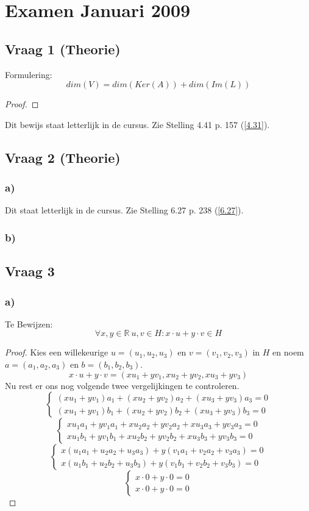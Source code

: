 \documentclass[lineaire_algebra_oplossingen.tex]{subfiles}
\begin{document}
\section{Examen Januari 2009}
\subsection{Vraag 1 (Theorie)}
Formulering:
\[
dim(V) = dim(Ker(A)) + dim(Im(L))
\]
\begin{proof}
\end{proof}
Dit bewijs staat letterlijk in de cursus. Zie Stelling 4.41 p. 157 (\ref{4.31}).

\subsection{Vraag 2 (Theorie)}
\subsubsection*{a)}
Dit staat letterlijk in de cursus. Zie Stelling 6.27 p. 238 (\ref{6.27}).

\subsubsection*{b)}

\subsection{Vraag 3}
\subsubsection*{a)}
Te Bewijzen:\\
\[
\forall x,y \in \mathbb{R}\ u,v \in H: x\cdot u + y\cdot v \in H
\]
\begin{proof}
Kies een willekeurige $u = (u_1,u_2,u_3)$ en $v = (v_1,v_2,v_3)$ in $H$ en noem $a = (a_1,a_2,a_3)$ en $b = (b_1,b_2,b_3)$.
\[
x\cdot u + y\cdot v = (xu_1 + yv_1, xu_2 + yv_2, xu_3 + yv_3)
\]
Nu rest er ons nog volgende twee vergelijkingen te controleren.
\[ 
\left\{
\begin{array}{c}
(xu_1 + yv_1)a_1 + (xu_2 + yv_2)a_2 + (xu_3 + yv_3)a_3 = 0\\
(xu_1 + yv_1)b_1 + (xu_2 + yv_2)b_2 + (xu_3 + yv_3)b_3 = 0 
\end{array}
\right.
\]
\[ 
\left\{
\begin{array}{c}
xu_1a_1 + yv_1a_1 + xu_2a_2 + yv_2a_2 + xu_3a_3 + yv_3a_3 = 0\\
xu_1b_1 + yv_1b_1 + xu_2b_2 + yv_2b_2 + xu_3b_3 + yv_3b_3 = 0 
\end{array}
\right.
\]
\[ 
\left\{
\begin{array}{c}
x(u_1a_1 + u_2a_2 + u_3a_3) + y(v_1a_1 + v_2a_2 + v_3a_3) = 0\\
x(u_1b_1 + u_2b_2 + u_3b_3) + y(v_1b_1 + v_2b_2 + v_3b_3) = 0 
\end{array}
\right.
\]
\[ 
\left\{
\begin{array}{c}
x\cdot 0 + y\cdot 0 = 0\\
x\cdot 0 + y\cdot 0 = 0 
\end{array}
\right.
\]
\end{proof}
\end{document}
